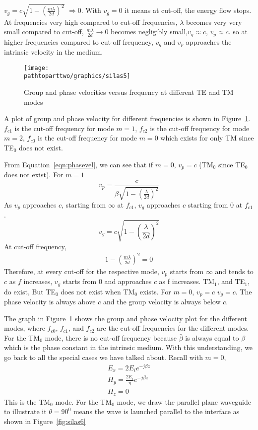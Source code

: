 $v_{g} =c \sqrt{1-(\frac{m\lambda}{2d})^{2}}$ $\Rightarrow 0$. With $v_{g} = 0$ it means at cut-off, the energy flow stops. At frequencies very high compared to cut-off frequencies, $\lambda$ becomes very very small compared to cut-off, $\frac{m\lambda}{2d} \rightarrow 0$ becomes negligibly small,$v_{g} \approx c$, $v_{p} \approx c$. so at higher frequencies compared to cut-off frequency, $v_{g}$ and $v_{p}$ approaches the intrinsic velocity in the medium.
\begin{figure}[h]
\centering
\texttt{[image: \\pathtoparttwo/graphics/silas5]}
\caption{Group and phase velocities versus frequency at different TE and TM modes}
\label{fig:silas5}
\end{figure}
A plot of group and phase velocity for different frequencies is shown in Figure~\ref{fig:silas5}. $f_{c1}$ is the cut-off frequency for mode $m=1$, $f_{c2}$ is the cut-off frequency for mode $m=2$, $f_{c0}$ is the cut-off frequency for mode $m=0$ which exists for only TM since TE$_0$ does not exist.

From Equation~\ref{eqn:phasevel}, we can see that if $m=0$, $v_{p} =c$ (TM$_0$ since TE$_0$ does not exist). For $m=1$
\begin{equation*}
v_{p}= \frac{c}{\beta \sqrt{1- \left(\frac{\lambda}{2d}\right)^{2}}}
\end{equation*}
As $v_{p}$ approaches $c$, starting from $\infty$ at $f_{c1}$, $v_{g}$ approaches $c$ starting from 0 at $f_{c1}$.
\begin{equation*}
v_{g}= c\sqrt{1-\left(\frac{\lambda}{2d}\right)^{2}}
\end{equation*}
At cut-off frequency, 
\begin{align*}
1-\left(\frac{m\lambda}{2d}\right)^{2} = 0
\end{align*}
Therefore, at every cut-off for the respective mode, $v_{p}$ starts from $\infty$ and tends to $c$ as $f$ increases, $v_{g}$ starts from 0 and approaches $c$ as f increases. TM$_1$, and TE$_1$, do exist, But TE$_0$ does not exist when TM$_0$ exists. For $m = 0$, $v_{p}=c$ $v_{g}=c$. The phase velocity is always above $c$ and the group velocity is always below $c$.

The graph in Figure~\ref{fig:silas5} shows the group and phase velocity plot for the different modes, where $f_{c0}$, $f_{c1}$, and $f_{c2}$ are the cut-off frequencies for the different modes. For the TM$_0$ mode, there is no cut-off frequency because $\bar{\beta}$ is always equal to $\beta$ which is the phase constant in the intrinsic medium. With this understanding, we go back to all the special cases we have talked about. Recall with $m = 0$, 
\begin{align*}
E_{x} =2E_{i} e^{-j\beta z}\\
H_{y} = \frac{2E_{i}}{\eta} e^{-j\beta z}\\
H_{z} =0
\end{align*}
This is the TM$_0$ mode. For the TM$_0$ mode, we draw the parallel plane waveguide to illustrate it $\theta =90^{0}$ means the wave is launched parallel to the interface as shown in Figure~\ref{fig:silas6}

